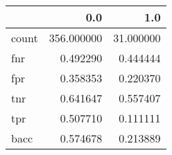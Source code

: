 \begin{tabular}{lrr}
\toprule
{} &         0.0 &        1.0 \\
\midrule
count &  356.000000 &  31.000000 \\
fnr   &    0.492290 &   0.444444 \\
fpr   &    0.358353 &   0.220370 \\
tnr   &    0.641647 &   0.557407 \\
tpr   &    0.507710 &   0.111111 \\
bacc  &    0.574678 &   0.213889 \\
\bottomrule
\end{tabular}
